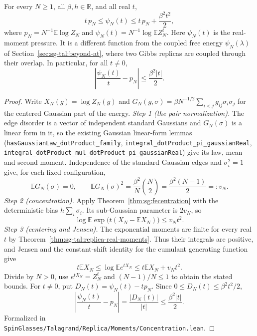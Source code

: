 \begin{theorem}\label{thm:sg-tal:replica-real-moment-sandwich}
\leanok
{}
For every $N \ge 1$, all $\beta, h \in \mathbb R$, and all real $t$,
\[
t\,p_N \le \psi_N(t) \le t\,p_N + \frac{\beta^2 t^2}{2},
\]
where $p_N = N^{-1}\mathbb E\log Z_N$ and $\psi_N(t) = N^{-1}\log\mathbb E Z_N^t$.
Here $\psi_N(t)$ is the real-moment pressure. It is a different function from the
coupled free energy $\psi_N(\lambda)$ of Section~\ref{sec:sg-tal:beyond-at}, where two
Gibbs replicas are coupled through their overlap.
In particular, for all $t \ne 0$,
\[
\left|\frac{\psi_N(t)}{t} - p_N\right| \le \frac{\beta^2 |t|}{2}.
\]
\end{theorem}
\begin{proof}
\leanok
Write $X_N(g)=\log Z_N(g)$ and
$G_N(g,\sigma)=\beta N^{-1/2}\sum_{i<j}g_{ij}\sigma_i\sigma_j$ for the centered Gaussian part of the energy.
\emph{Step 1 (the pair normalization).} The edge disorder is a vector of independent standard Gaussians and $G_N(\sigma)$ is a linear form in it, so the existing Gaussian linear-form lemmas
(\texttt{hasGaussianLaw\_dotProduct\_family}, \texttt{integral\_dotProduct\_pi\_gaussianReal},
\texttt{integral\_dotProduct\_mul\_dotProduct\_pi\_gaussianReal}) give its law, mean and second moment. Independence of the standard Gaussian edges and
$\sigma_i^2=1$ give, for each fixed configuration,
\[
\mathbb E G_N(\sigma)=0,\qquad
\mathbb E G_N(\sigma)^2=\frac{\beta^2}{N}\binom N2
=\frac{\beta^2(N-1)}2=:v_N.
\]
\emph{Step 2 (concentration).} Apply Theorem~\ref{thm:sg:fecentration} with the deterministic
bias $h\sum_i\sigma_i$. Its sub-Gaussian parameter is $2v_N$, so
\[
\log\mathbb E\exp\bigl(t(X_N-\mathbb EX_N)\bigr)\le v_Nt^2.
\]
\emph{Step 3 (centering and Jensen).} The exponential moments are finite for every real $t$
by Theorem~\ref{thm:sg-tal:replica-real-moments}. Thus their integrals are positive, and
Jensen and the constant-shift identity for the cumulant generating function give
\[
t\mathbb EX_N\le\log\mathbb Ee^{tX_N}
\le t\mathbb EX_N+v_Nt^2.
\]
Divide by $N>0$, use $e^{tX_N}=Z_N^t$ and $(N-1)/N\le1$ to obtain the stated bounds.
For $t\ne0$, put $D_N(t)=\psi_N(t)-tp_N$. Since $0\le D_N(t)\le\beta^2t^2/2$,
\[
\left|\frac{\psi_N(t)}t-p_N\right|
=\frac{|D_N(t)|}{|t|}\le\frac{\beta^2|t|}{2}.
\]
Formalized in \texttt{SpinGlasses/Talagrand/Replica/Moments/Concentration.lean}.
\end{proof}

